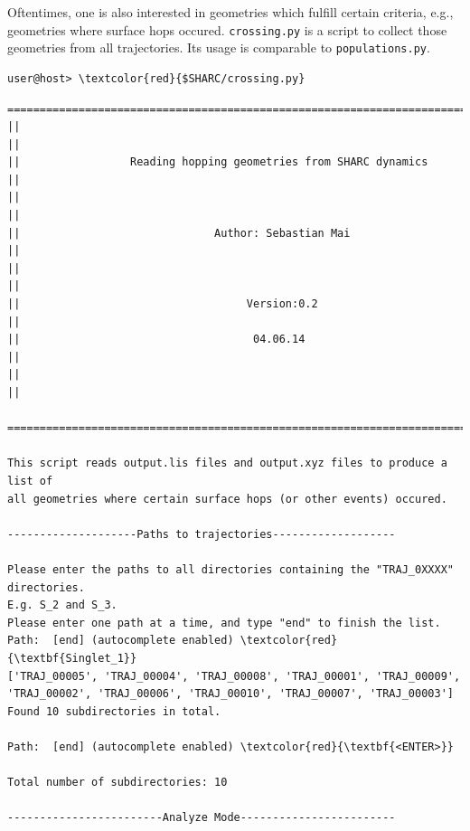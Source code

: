 \documentclass[a4paper,11pt,DIV=15,openany]{scrbook}
\newcommand{\ttt}[1]{\texttt{#1}}
\begin{document}
Oftentimes, one is also interested in geometries which fulfill certain criteria, e.g., geometries where surface hops occured. \ttt{crossing.py} is a script to collect those geometries from all trajectories. Its usage is comparable to \ttt{populations.py}.
\begin{Verbatim}[commandchars=\\\{\}]
user@host> \textcolor{red}{$SHARC/crossing.py}
\end{Verbatim}

\begin{oframed}
\footnotesize\begin{Verbatim}[commandchars=\\\{\}]
  ================================================================================
||                                                                                ||
||                 Reading hopping geometries from SHARC dynamics                 ||
||                                                                                ||
||                              Author: Sebastian Mai                             ||
||                                                                                ||
||                                   Version:0.2                                  ||
||                                    04.06.14                                    ||
||                                                                                ||
  ================================================================================

This script reads output.lis files and output.xyz files to produce a list of 
all geometries where certain surface hops (or other events) occured.
  
--------------------Paths to trajectories-------------------

Please enter the paths to all directories containing the "TRAJ_0XXXX" directories.
E.g. S_2 and S_3. 
Please enter one path at a time, and type "end" to finish the list.
Path:  [end] (autocomplete enabled) \textcolor{red}{\textbf{Singlet_1}}
['TRAJ_00005', 'TRAJ_00004', 'TRAJ_00008', 'TRAJ_00001', 'TRAJ_00009', 
'TRAJ_00002', 'TRAJ_00006', 'TRAJ_00010', 'TRAJ_00007', 'TRAJ_00003']
Found 10 subdirectories in total.

Path:  [end] (autocomplete enabled) \textcolor{red}{\textbf{<ENTER>}}

Total number of subdirectories: 10

------------------------Analyze Mode------------------------


\end{Verbatim}
\end{oframed}
\end{document}
